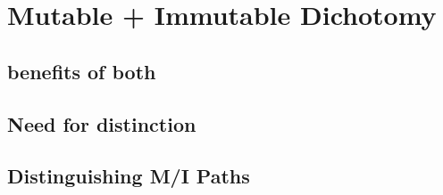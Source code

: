 \documentclass{sig-alternate}
\begin{document}
\section{Mutable + Immutable Dichotomy}
\subsection{benefits of both}
\subsection{Need for distinction}
\subsection{Distinguishing M/I Paths}

%
%
\end{document}
